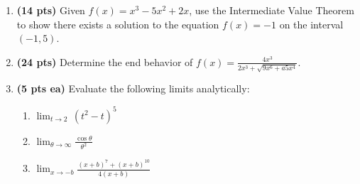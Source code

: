 \documentclass[12pt]{article}
\begin{document}
\begin{enumerate}

\newpage
\item {\bf (14 pts)} Given %
$f(x)=x^3-5x^2+2x$, use the Intermediate Value Theorem to show there exists
a solution to the equation %
$f(x)=-1$ on the interval $(-1,5)$.
\vspace{22pc}

\item {\bf (24 pts)} Determine the end behavior of %
	$f(x)=\frac{4x^3}{2x^3+\sqrt{9x^6+a5x^4}}$.
	\vspace{22pc}

\newpage
\item {\bf (5 pts ea)} Evaluate the following limits analytically:
\begin{enumerate}
	\item $\lim_{t\to 2}\,(t^2-t)^5$
	\vspace{14pc}
	\item $\lim_{\theta\to\infty}\frac{\cos{\theta}}{\theta^2}$
	\vspace{14pc}
		
	\item $\lim_{x\to -b}\frac{(x+b)^7+(x+b)^{10}}{4(x+b)}$
	\vspace{14pc}
\end{enumerate}

\newpage
\begin{comment}
\item \begin{enumerate}\vspace{-2pc}
	\item {\bf (7 pts)} Using the graph below, find the $\delta$ that satisfies $|f(x)-5|<1$ whenever $0<|x-4|<\delta$.
	\vspace{4pc}
	
	\item {\bf (7 pts)} Use the same graph to find the $\delta$ that satisfies $|f(x)-5|<\textstyle\frac{1}{2}$ whenever $0<|x-4|<\delta$.
	\vspace{4pc}
	

\end{comment}
\end{enumerate}
\end{document}
